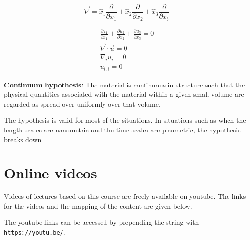 $$\vec{\nabla} = \hat{x}_1 \frac{\partial}{\partial x_1} + \hat{x}_2 \frac{\partial}{\partial x_2} + \hat{x}_3 \frac{\partial}{\partial x_3} $$

\begin{eqnarray}
\frac{\partial u_1}{\partial x_1} + \frac{\partial u_2}{\partial x_2} + \frac{\partial u_3}{\partial x_3} = 0 \\
\vec{\nabla} \cdot \vec{u} = 0 \\
\nabla_i u_i = 0 \\
u_{i,i} = 0
\end{eqnarray} 

{\bf Continuum hypothesis:} The material is continuous in structure such that the physical quantities associated with the material within a given small volume are regarded as spread over uniformly over that volume.


The hypothesis is valid for most of the situations. In situations such as when the length scales are nanometric and the time scales are picometric, the hypothesis breaks down.

\section{Online videos}

Videos of lectures based on this course are freely available on youtube. The links for the videos and the mapping of the content are given below.

The youtube links can be accessed by prepending the string with {\tt https://youtu.be/}.


